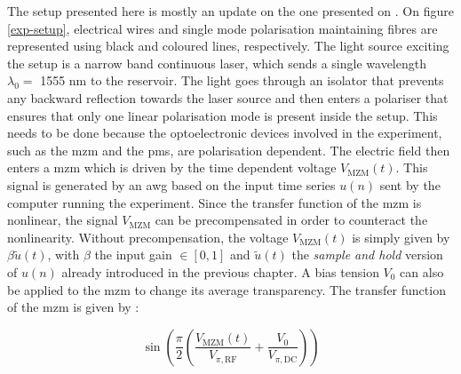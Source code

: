 The setup presented here is mostly an update on the one presented on \cite{AkroutAkram2016Pprc}. On figure \ref{exp-setup}, electrical wires and single mode polarisation maintaining fibres are represented using black and coloured lines, respectively.  The light source exciting the setup is a narrow band continuous laser, which sends a single wavelength $\lambda_0 =$ 1555 nm to the reservoir. The light goes through an isolator that prevents any backward reflection towards the laser source and then enters a polariser that ensures that only one linear polarisation mode is present inside the setup. This needs to be done because the optoelectronic devices involved in the experiment, such as the \gls{mzm} and the \glspl{pm}, are polarisation dependent. The electric field then enters a \gls{mzm} which is driven by the time dependent voltage $V_{\text{MZM}}(t)$. This signal is generated by an \gls{awg} based on the input time series $u(n)$ sent by the computer running the experiment. Since the transfer function of the \gls{mzm} is nonlinear, the signal $V_{\text{MZM}}$ can be precompensated in order to counteract the nonlinearity. Without precompensation, the voltage $V_{\text{MZM}}(t)$ is simply given by $\beta \tilde{u}(t)$, with $\beta$ the input gain $\in [0,1]$ and $\tilde{u}(t)$ the \textit{sample and hold} version of $u(n)$ already introduced in the previous chapter. A bias tension $V_0$ can also be applied to the \gls{mzm} to change its average transparency. The transfer function of the \gls{mzm} is given by :

\begin{equation}
	\sin{ \left(\frac{\pi}{2} \left(\frac{V_{\text{MZM}}(t)}{V_{\pi,\text{RF}}} + \frac{V_0}{V_{\pi, \text{DC}}} \right) \right)}
\end{equation}

